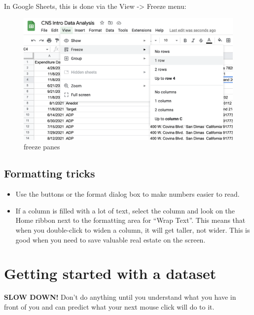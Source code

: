 \documentclass[
  letterpaper,
  DIV=11,
  numbers=noendperiod]{scrreprt}
\begin{document}
In Google Sheets, this is done via the View -\textgreater{} Freeze menu:

\begin{figure}

{\centering \includegraphics[width=1\textwidth,height=\textheight]{./images/sheets-refresher-freezepanes.png}

}

\caption{freeze panes}

\end{figure}

\hypertarget{formatting-tricks}{%
\subsection{Formatting tricks}\label{formatting-tricks}}

\begin{itemize}
\item
  Use the buttons or the format dialog box to make numbers easier to
  read.
\item
  If a column is filled with a lot of text, select the column and look
  on the Home ribbon next to the formatting area for ``Wrap Text''. This
  means that when you double-click to widen a column, it will get
  taller, not wider. This is good when you need to save valuable real
  estate on the screen.
\end{itemize}

\hypertarget{getting-started-with-a-dataset}{%
\section{Getting started with a
dataset}\label{getting-started-with-a-dataset}}

\textbf{SLOW DOWN!} Don't do anything until you understand what you have
in front of you and can predict what your next mouse click will do to
it.
\end{document}
